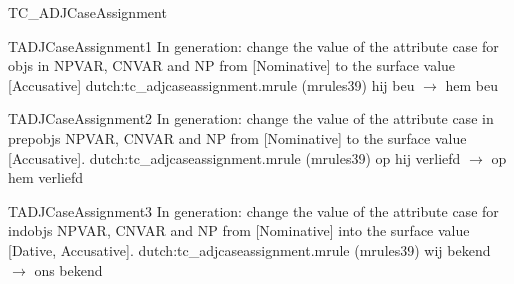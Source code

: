 \begin{mruleclass}{TC\_ADJCaseAssignment}
\begin{classdescr}
\nospeedrules

\noplannedrules

\norulesnotince

\end{classdescr}

\begin{members}
\begin{member}
 TADJCaseAssignment1
 In generation: change the value of the attribute case for objs
in NPVAR, 
CNVAR and NP from [Nominative] to the surface value [Accusative]
\file dutch:tc\_adjcaseassignment.mrule (mrules39)
\semantics \nosemantics
\example hij beu $\rightarrow$ hem beu
\remarks\mbox{}

\end{member}
\begin{member}
 TADJCaseAssignment2
 In generation: change the value of the attribute case in prepobjs 
NPVAR, 
CNVAR and NP from [Nominative] to the surface value [Accusative].
\file dutch:tc\_adjcaseassignment.mrule (mrules39)
\semantics \nosemantics
\example op hij verliefd $\rightarrow$ op hem verliefd 
\remarks\mbox{}

\end{member}
\begin{member}
 TADJCaseAssignment3
 In generation: change the value of the attribute case for 
indobjs NPVAR, 
CNVAR and NP from [Nominative] into the surface value [Dative, Accusative].
\file dutch:tc\_adjcaseassignment.mrule (mrules39)
\semantics \nosemantics
\example wij bekend $\rightarrow$ ons bekend
\remarks\mbox{}

\end{member}
\end{members}


\end{mruleclass}
